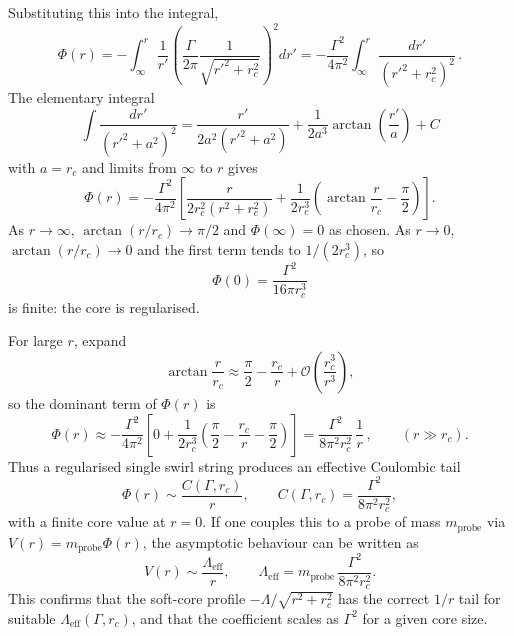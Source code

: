 \documentclass[10pt,reprint,aps,onecolumn,nofootinbib]{revtex4-2}
\begin{document}
    Substituting this into the integral,
    \begin{equation}
        \Phi(r)
        = -\int_{\infty}^{r} \frac{1}{r'}\left(\frac{\Gamma}{2\pi}\frac{1}{\sqrt{r'^2+r_c^2}}\right)^{\!2} dr'
        = -\frac{\Gamma^2}{4\pi^2}
        \int_{\infty}^{r} \frac{dr'}{(r'^2+r_c^2)^{2}}\,.
    \end{equation}
    The elementary integral
    \begin{equation}
        \int \frac{dr'}{(r'^2+a^2)^{2}}
        = \frac{r'}{2a^2(r'^2+a^2)} + \frac{1}{2a^3}\arctan\!\left(\frac{r'}{a}\right) + C
    \end{equation}
    with $a=r_c$ and limits from $\infty$ to $r$ gives
    \begin{equation}
        \Phi(r) =
        -\frac{\Gamma^2}{4\pi^2}
        \left[
            \frac{r}{2r_c^2(r^2+r_c^2)}
            + \frac{1}{2r_c^3}
            \left(
                \arctan\!\frac{r}{r_c} - \frac{\pi}{2}
            \right)
        \right].
    \end{equation}
    As $r\to\infty$, $\arctan(r/r_c)\to\pi/2$ and $\Phi(\infty)=0$ as chosen.
    As $r\to 0$, $\arctan(r/r_c)\to 0$ and the first term tends to $1/(2r_c^3)$, so
    \begin{equation}
        \Phi(0) = \frac{\Gamma^2}{16\pi r_c^3}
    \end{equation}
    is finite: the core is regularised.

    For large $r$, expand
    \begin{equation}
        \arctan\!\frac{r}{r_c} \approx \frac{\pi}{2} - \frac{r_c}{r} + \mathcal{O}\!\left(\frac{r_c^3}{r^3}\right),
    \end{equation}
    so the dominant term of $\Phi(r)$ is
    \begin{equation}
        \Phi(r)
        \approx -\frac{\Gamma^2}{4\pi^2}
        \left[
            0
            + \frac{1}{2r_c^3}
            \left(
                \frac{\pi}{2} - \frac{r_c}{r} - \frac{\pi}{2}
            \right)
        \right]
        = \frac{\Gamma^2}{8\pi^2 r_c^2}\,\frac{1}{r}\,,
        \qquad (r\gg r_c).
    \end{equation}
    Thus a regularised single swirl string produces an effective Coulombic tail
    \begin{equation}
        \Phi(r) \sim \frac{C(\Gamma,r_c)}{r},\qquad
        C(\Gamma,r_c) = \frac{\Gamma^2}{8\pi^2 r_c^2},
    \end{equation}
    with a finite core value at $r=0$. If one couples this to a probe of mass
    $m_{\text{probe}}$ via $V(r) = m_{\text{probe}}\Phi(r)$, the asymptotic
    behaviour can be written as
    \begin{equation}
        V(r) \sim \frac{\Lambda_{\text{eff}}}{r},\qquad
        \Lambda_{\text{eff}} = m_{\text{probe}}\,\frac{\Gamma^2}{8\pi^2 r_c^2}.
    \end{equation}
    This confirms that the soft-core profile
    $-\Lambda/\sqrt{r^2+r_c^2}$ has the correct $1/r$ tail for suitable
    $\Lambda_{\text{eff}}(\Gamma,r_c)$, and that the coefficient scales as
    $\Gamma^2$ for a given core size.
\end{document}
